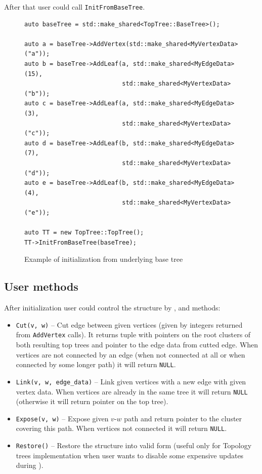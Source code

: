 After that user could call \texttt{InitFromBaseTree}.

\begin{figure}[H]
\begin{verbatim}
auto baseTree = std::make_shared<TopTree::BaseTree>();

auto a = baseTree->AddVertex(std::make_shared<MyVertexData>("a"));
auto b = baseTree->AddLeaf(a, std::make_shared<MyEdgeData>(15),
                           std::make_shared<MyVertexData>("b"));
auto c = baseTree->AddLeaf(a, std::make_shared<MyEdgeData>(3),
                           std::make_shared<MyVertexData>("c"));
auto d = baseTree->AddLeaf(b, std::make_shared<MyEdgeData>(7),
                           std::make_shared<MyVertexData>("d"));
auto e = baseTree->AddLeaf(b, std::make_shared<MyEdgeData>(4),
                           std::make_shared<MyVertexData>("e"));

auto TT = new TopTree::TopTree();
TT->InitFromBaseTree(baseTree);
\end{verbatim}
\caption{Example of initialization from underlying base tree}
\label{verb:example_init}
\end{figure}

\subsection{User methods}

After initialization user could control the structure by \Link, \Cut{} and \Expose{}
methods:
\begin{itemize}

\item \texttt{Cut(v, w)} -- Cut edge between given vertices (given by integers
returned from \texttt{AddVertex} calls). It returns tuple with pointers on the
root clusters of both resulting top trees and pointer to the edge data from
cutted edge. When vertices are not connected by an edge (when not connected at
all or when connected by some longer path) it will return \texttt{NULL}.

\item \texttt{Link(v, w, edge\_data)} -- Link given vertices with a new edge
with given vertex data. When vertices are already in the same tree it will
return \texttt{NULL} (otherwise it will return pointer on the top tree).

\item \texttt{Expose(v, w)} -- Expose given $v$-$w$ path and return pointer to
the cluster covering this path. When vertices not connected it will return
\texttt{NULL}.

\item \texttt{Restore()} -- Restore the structure into valid form (useful only
for Topology trees implementation when user wants to disable some expensive
updates during \Expose).

\end{itemize}

